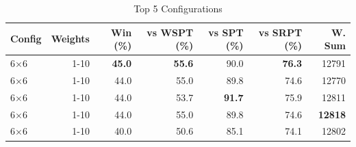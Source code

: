 \begin{table}[htbp]%
\centering%
\begin{tabular}{lrrrrrr}%
\toprule%
\textbf{Config}&\textbf{Weights}&\textbf{Win (\%)}&\textbf{vs WSPT (\%)}&\textbf{vs SPT (\%)}&\textbf{vs SRPT (\%)}&\textbf{W. Sum}\\%
\midrule%
6×6&1-10&\textbf{45.0}&\textbf{55.6}&90.0&\textbf{76.3}&12791\\%
6×6&1-10&44.0&55.0&89.8&74.6&12770\\%
6×6&1-10&44.0&53.7&\textbf{91.7}&75.9&12811\\%
6×6&1-10&44.0&55.0&89.8&74.6&\textbf{12818}\\%
6×6&1-10&40.0&50.6&85.1&74.1&12802\\%
\bottomrule%
\end{tabular}%
\caption{Top 5 Configurations}%
\label{tab:summary}%
\end{table}